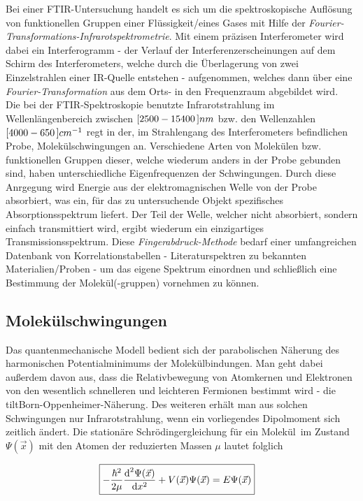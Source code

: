 \documentclass[a4paper,10pt,twocolumn]{article}
\newcommand{\diff}{\textnormal{d}}
\newcommand{\tilt}[1]{\textit{#1}}
\begin{document}
		Bei einer FTIR-Untersuchung handelt es sich um die spektroskopische Aufl\"osung von funktionellen Gruppen einer Fl\"ussigkeit/eines Gases mit Hilfe der \tilt{Fourier-Transformations-Infrarotspektrometrie}. Mit einem pr\"azisen Interferometer wird dabei ein Interferogramm - der Verlauf der Interferenzerscheinungen auf dem Schirm des Interferometers, welche durch die \"Uberlagerung von zwei Einzelstrahlen einer IR-Quelle entstehen - aufgenommen, welches dann \"uber eine \tilt{Fourier-Transformation} aus dem Orts- in den Frequenzraum abgebildet wird.\\
		Die bei der FTIR-Spektroskopie benutzte Infrarotstrahlung im Wellenl\"angenbereich zwischen $\unit[[2500-15400]]{nm}$ bzw. den Wellenzahlen $\unit[[4000-650]]{cm^{-1}}$ regt in der, im Strahlengang des Interferometers befindlichen Probe, Molek\"ulschwingungen an. Verschiedene Arten von Molek\"ulen bzw. funktionellen Gruppen dieser, welche wiederum anders in der Probe gebunden sind, haben unterschiedliche Eigenfrequenzen der Schwingungen. Durch diese Anrgegung wird Energie aus der elektromagnischen Welle von der Probe absorbiert, was ein, f\"ur das zu untersuchende Objekt spezifisches Absorptionsspektrum liefert. Der Teil der Welle, welcher nicht absorbiert, sondern einfach transmittiert wird, ergibt wiederum ein einzigartiges Transmissionsspektrum. Diese \tilt{Fingerabdruck-Methode} bedarf einer umfangreichen Datenbank von Korrelationstabellen - Literaturspektren zu bekannten Materialien/Proben - um das eigene Spektrum einordnen und schlie{\ss}lich eine Bestimmung der Molek\"ul(-gruppen) vornehmen zu k\"onnen.
		
	\subsection{Molek\"ulschwingungen}
	
		Das quantenmechanische Modell bedient sich der parabolischen N\"aherung des harmonischen Potentialminimums der Molek\"ulbindungen. Man geht dabei au{\ss}erdem davon aus, dass die Relativbewegung von Atomkernen und Elektronen von den wesentlich schnelleren und leichteren Fermionen bestimmt wird - die tilt{Born-Oppenheimer-N\"aherung}. Des weiteren erh\"alt man aus solchen Schwingungen nur Infrarotstrahlung, wenn ein vorliegendes Dipolmoment sich zeitlich \"andert. Die station\"are Schr\"odingergleichung f\"ur ein Molek\"ul\ im Zustand $\Psi(\vec{x})$ mit den Atomen der reduzierten Massen $\mu$	lautet folglich \cite{FTIRInfra}
		
			\begin{align}
				\Aboxed{
				-\frac{\hbar^{2}}{2\mu}\frac{\diff^{2}\Psi(\vec{x})}{\diff x^{2}}+V(\vec{x})\Psi(\vec{x})=E\Psi(\vec{x})
				}
				\label{eq:schroed}
			\end{align}
	
\end{document}
